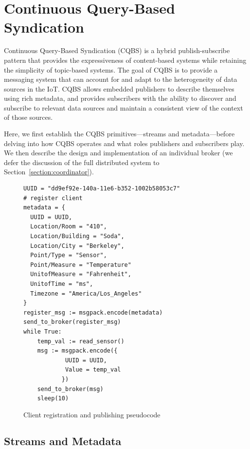 \section{Continuous Query-Based Syndication}

Continuous Query-Based Syndication (CQBS) is a hybrid publish-subscribe pattern that provides the expressiveness of content-based systems while retaining the simplicity of topic-based systems.
The goal of CQBS is to provide a messaging system that can account for and adapt to the heterogeneity of data sources in the IoT.
CQBS allows embedded publishers to describe themselves using rich metadata, and provides subscribers with the ability to discover and subscribe to relevant data sources and maintain a consistent view of the context of those sources.

Here, we first establish the CQBS primitives---streams and metadata---before delving into how CQBS operates and what roles publishers and subscribers play.
We then describe the design and implementation of an individual broker (we defer the discussion of the full distributed system to Section~\ref{section:coordinator}).

\begin{figure}
\centering
\begin{lstlisting}[language=pseudocode,basicstyle=\small]
UUID = "dd9ef92e-140a-11e6-b352-1002b58053c7"
# register client
metadata = {
  UUID = UUID,
  Location/Room = "410",
  Location/Building = "Soda",
  Location/City = "Berkeley",
  Point/Type = "Sensor",
  Point/Measure = "Temperature"
  UnitofMeasure = "Fahrenheit",
  UnitofTime = "ms",
  Timezone = "America/Los_Angeles"
}
register_msg := msgpack.encode(metadata)
send_to_broker(register_msg)
while True:
    temp_val := read_sensor()
    msg := msgpack.encode({
            UUID = UUID,
            Value = temp_val
           })
    send_to_broker(msg)
    sleep(10)
\end{lstlisting}
\caption{Client registration and publishing pseudocode}
\label{fig:pseudoclient}
\end{figure}

\subsection{Streams and Metadata}

